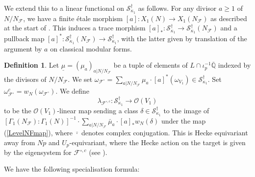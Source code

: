 \documentclass[10pt, oneside]{amsart}
\numberwithin{equation}{subsection}
\theoremstyle{definition}
\newtheorem{definition}[equation]{Definition}
\theoremstyle{remark}
\newcommand{\mbb}[1]{\mathbb{#1}}
\begin{document}
We extend this to a linear functional on $\mathscr{S}^{\dagger}_{\kappa_1}$ as follows. For any divisor $a \geq 1$ of $N/N_{\mathcal{F}}$, we have a finite \'{e}tale morphism $[a] \colon X_1(N) \to X_1(N_{\mathcal{F}})$ as described at the start of \cite[\S 5]{AI_LLL}. This induces a trace morphism $[a]_* \colon \mathscr{S}^{\dagger}_{\kappa_1} \to \mathscr{S}^{\dagger}_{\kappa_1}(N_{\mathcal{F}})$ and a pullback map $[a]^* \colon \mathscr{S}^{\dagger}_{\kappa_1}(N_{\mathcal{F}}) \to \mathscr{S}^{\dagger}_{\kappa_1}$, with the latter given by translation of the argument by $a$ on classical modular forms.

\begin{definition} \label{DefOfLinearFunctional}
Let $\underline{\mu} = (\mu_a)_{a | N/N_{\mathcal{F}}}$ be a tuple of elements of $L \cap \iota_p^{-1}\overline{\mbb{Q}}$ indexed by the divisors of $N/N_{\mathcal{F}}$. We set $\omega_{\mathcal{F}^{\circ}} = \sum_{a | N/N_{\mathcal{F}}} \mu_a \cdot [a]^*(\omega_{V_1}) \in \mathscr{S}^{\dagger}_{\kappa_1}$. Set $\omega_{\mathcal{F}^{\circ}}^c = w_N(\omega_{\mathcal{F}^{\circ}})$. We define
\[
\lambda_{\mathcal{F}^{\circ, c}} \colon \mathscr{S}^{\dagger}_{\kappa_1} \to \mathcal{O}(V_1)
\]
to be the $\mathcal{O}(V_1)$-linear map sending a class $\delta \in \mathscr{S}^{\dagger}_{\kappa_1}$ to the image of $[\Gamma_1(N_{\mathcal{F}}): \Gamma_1(N)]^{-1} \cdot \sum_{a | N/N_{\mathcal{F}}} \bar{\mu}_a \cdot [a]_* w_N(\delta)$ under the map (\ref{LevelNFmap}), where $\bar{\cdot}$ denotes complex conjugation. This is Hecke equivariant away from $Np$ and $U_p$-equivariant, where the Hecke action on the target is given by the eigensystem for $\mathcal{F}^{\circ, c}$ (see \cite[Lemma 3.4]{LoefflerRSNote}).
\end{definition}

We have the following specialisation formula:
\end{document}
